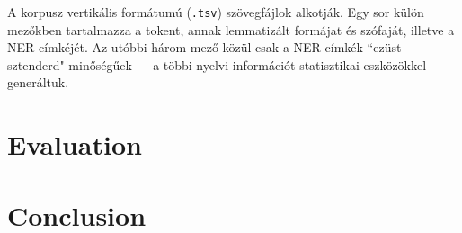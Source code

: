 \documentclass{llncs}
\begin{document}
A korpusz vertikális formátumú (\texttt{.tsv}) szövegfájlok alkotják. Egy sor külön
mezőkben tartalmazza a tokent, annak lemmatizált formájat és szófaját, illetve a NER
címkéjét. Az utóbbi három mező közül csak a NER címkék ``ezüst sztenderd" minőségűek
--- a többi nyelvi információt statisztikai eszközökkel generáltuk.

\section{Evaluation}

\section{Conclusion}

\cite{Nothman:08} \cite{Szarvas:06} \cite{Medelyan:09}

%
%


\end{document}
